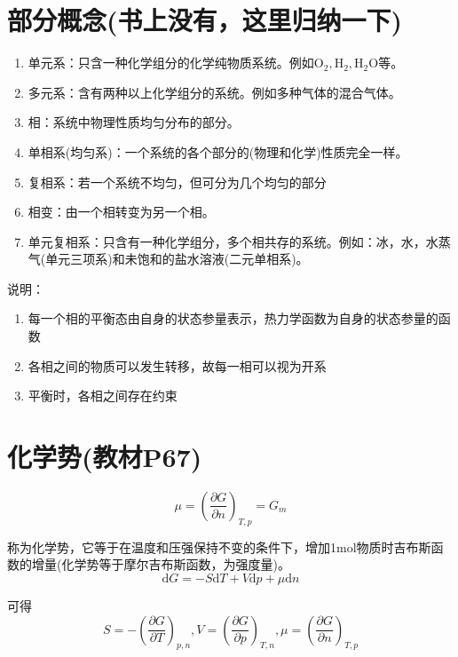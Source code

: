 \documentclass[oneside]{ctexbook}
\begin{document}
\section{部分概念(书上没有，这里归纳一下)}
\begin{enumerate}
    \item 单元系：只含一种化学组分的化学纯物质系统。例如\(\mathrm{O}_2,\mathrm{H}_2,\mathrm{H}_2\mathrm{O}\)等。
    \item 多元系：含有两种以上化学组分的系统。例如多种气体的混合气体。
    \item 相：系统中物理性质均匀分布的部分。
    \item 单相系(均匀系)：一个系统的各个部分的(物理和化学)性质完全一样。
    \item 复相系：若一个系统不均匀，但可分为几个均匀的部分
    \item 相变：由一个相转变为另一个相。
    \item 单元复相系：只含有一种化学组分，多个相共存的系统。例如：冰，水，水蒸气(单元三项系)和未饱和的盐水溶液(二元单相系)。
\end{enumerate}

说明：
\begin{enumerate}
    \item 每一个相的平衡态由自身的状态参量表示，热力学函数为自身的状态参量的函数
    \item 各相之间的物质可以发生转移，故每一相可以视为开系
    \item 平衡时，各相之间存在约束
\end{enumerate}

\section{化学势(教材P67)}
\begin{equation}
\mu=\left(\dfrac{\partial{}G}{\partial{}n}\right)_{T,p}=G_m
\end{equation}

称为化学势，它等于在温度和压强保持不变的条件下，增加1mol物质时吉布斯函数的增量(化学势等于摩尔吉布斯函数，为强度量)。
\begin{equation}
\mathrm{d}G=-S\mathrm{d}T+V\mathrm{d}p+\mu\mathrm{d}n
\end{equation}

可得
\begin{equation}
S=-\left(\dfrac{\partial{}G}{\partial{}T}\right)_{p,n},V=\left(\dfrac{\partial{}G}{\partial{}p}\right)_{T,n},\mu=\left(\dfrac{\partial{}G}{\partial{}n}\right)_{T,p}
\end{equation}
\end{document}

